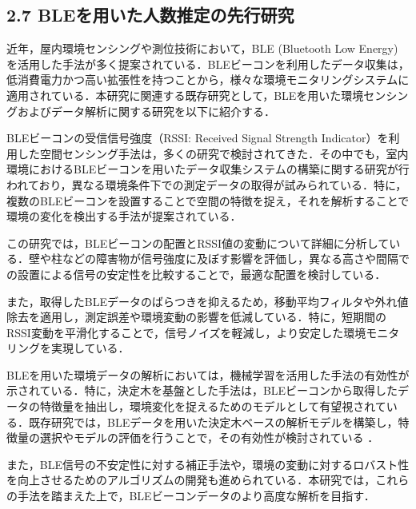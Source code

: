 \subsection*{2.7 BLEを用いた人数推定の先行研究}

近年，屋内環境センシングや測位技術において，BLE (Bluetooth Low Energy) を活用した手法が多く提案されている．BLEビーコンを利用したデータ収集は，低消費電力かつ高い拡張性を持つことから，様々な環境モニタリングシステムに適用されている．本研究に関連する既存研究として，BLEを用いた環境センシングおよびデータ解析に関する研究を以下に紹介する．

BLEビーコンの受信信号強度（RSSI: Received Signal Strength Indicator）を利用した空間センシング手法は，多くの研究で検討されてきた．その中でも，室内環境におけるBLEビーコンを用いたデータ収集システムの構築に関する研究が行われており，異なる環境条件下での測定データの取得が試みられている\cite{BLECE-Room_c_202205_yukimat_SeMI}．特に，複数のBLEビーコンを設置することで空間の特徴を捉え，それを解析することで環境の変化を検出する手法が提案されている．

この研究では，BLEビーコンの配置とRSSI値の変動について詳細に分析している．壁や柱などの障害物が信号強度に及ぼす影響を評価し，異なる高さや間隔での設置による信号の安定性を比較することで，最適な配置を検討している．

また，取得したBLEデータのばらつきを抑えるため，移動平均フィルタや外れ値除去を適用し，測定誤差や環境変動の影響を低減している．特に，短期間のRSSI変動を平滑化することで，信号ノイズを軽減し，より安定した環境モニタリングを実現している．


BLEを用いた環境データの解析においては，機械学習を活用した手法の有効性が示されている．特に，決定木を基盤とした手法は，BLEビーコンから取得したデータの特徴量を抽出し，環境変化を捉えるためのモデルとして有望視されている．既存研究では，BLEデータを用いた決定木ベースの解析モデルを構築し，特徴量の選択やモデルの評価を行うことで，その有効性が検討されている \cite{BLECE-Room_c_202205_yukimat_SeMI}．

また，BLE信号の不安定性に対する補正手法や，環境の変動に対するロバスト性を向上させるためのアルゴリズムの開発も進められている．本研究では，これらの手法を踏まえた上で，BLEビーコンデータのより高度な解析を目指す．
